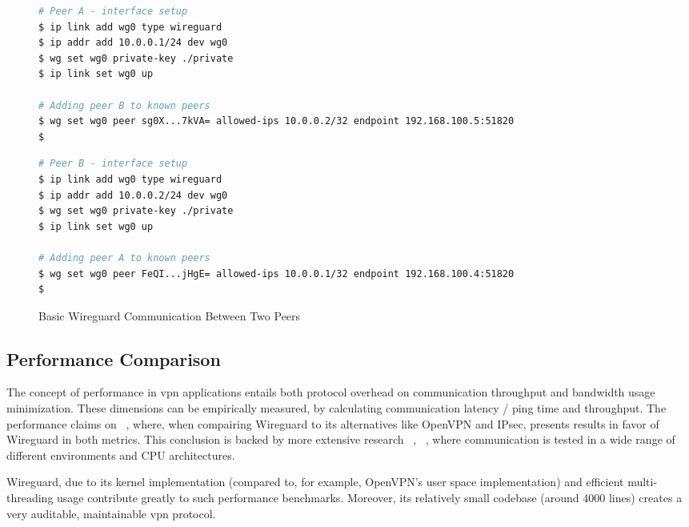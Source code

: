 \documentclass[11pt,twoside,a4paper]{report}
\begin{document}
\begin{figure}
\begin{multicols}{2}
\begin{lstlisting}[language=sh, frame=single, breaklines=true, breakatwhitespace=true, basicstyle=\small]
# Peer A - interface setup
$ ip link add wg0 type wireguard
$ ip addr add 10.0.0.1/24 dev wg0
$ wg set wg0 private-key ./private
$ ip link set wg0 up

# Adding peer B to known peers
$ wg set wg0 peer sg0X...7kVA= allowed-ips 10.0.0.2/32 endpoint 192.168.100.5:51820
$

\end{lstlisting}
\columnbreak
\begin{lstlisting}[language=sh, frame=single, breaklines=true, breakatwhitespace=true, basicstyle=\small]
# Peer B - interface setup
$ ip link add wg0 type wireguard
$ ip addr add 10.0.0.2/24 dev wg0
$ wg set wg0 private-key ./private
$ ip link set wg0 up

# Adding peer A to known peers
$ wg set wg0 peer FeQI...jHgE= allowed-ips 10.0.0.1/32 endpoint 192.168.100.4:51820
$

\end{lstlisting}
\end{multicols}
\label{fig:wgconf}
\caption{Basic Wireguard Communication Between Two Peers}
\end{figure}

\subsection{Performance Comparison}

The concept of performance in \acrshort{vpn} applications entails both protocol overhead on communication throughput and bandwidth usage minimization. These dimensions can be empirically measured, by calculating communication latency / ping time and throughput. The performance claims on ~\cite{donenfeld2017wireguard}, where, when compairing Wireguard to its alternatives like OpenVPN and IPsec, presents results in favor of Wireguard in both metrics. This conclusion is backed by more extensive research ~\cite{mackey2020performance}, ~\cite{osswald2020performance}, where communication is tested in a wide range of different environments and CPU architectures.

Wireguard, due to its kernel implementation (compared to, for example, OpenVPN's user space implementation) and efficient multi-threading usage contribute greatly to such performance benchmarks. Moreover, its relatively small codebase (around 4000 lines) creates a very auditable, maintainable \acrshort{vpn} protocol.
\end{document}
